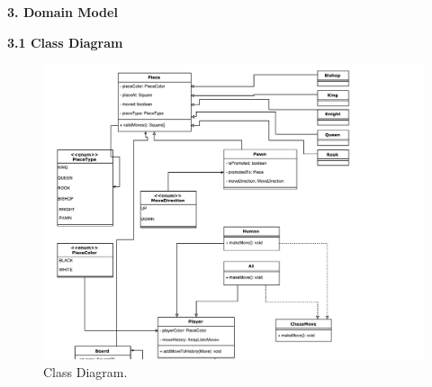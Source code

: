 \documentclass{article}
\begin{document}
\begin{flushleft}
\vspace{10mm}

\newpage
\begin{Large}\textbf{3.	Domain Model}\\	
\end{Large}
\vspace{3mm}
\textbf{3.1	Class Diagram}

\begin{figure}[h]
	\includegraphics*[scale=0.6]{Class-diagram}
	\caption{Class Diagram.}	
\end{figure}
	
\end{flushleft}
\end{document}
